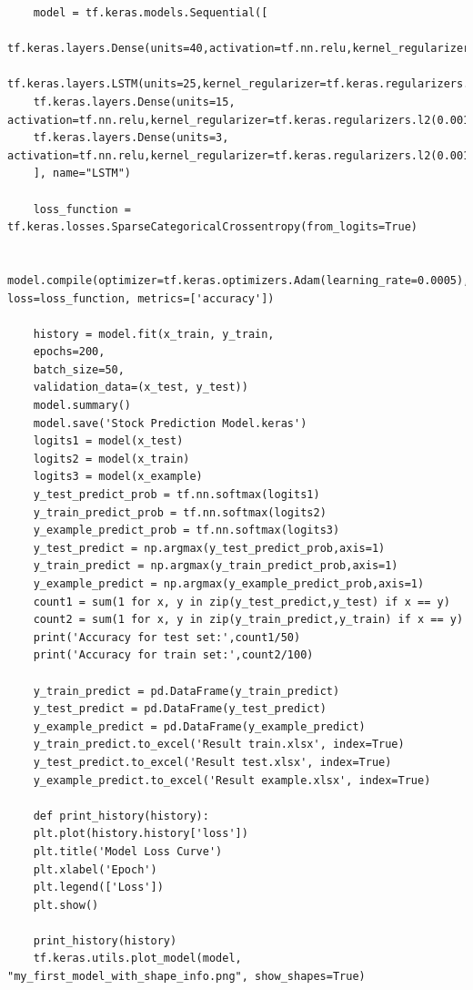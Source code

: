 \documentclass[default,iicol]{sn-jnl}%
\begin{document}
\begin{appendices}
\begin{lstlisting}
	model = tf.keras.models.Sequential([
	tf.keras.layers.Dense(units=40,activation=tf.nn.relu,kernel_regularizer=tf.keras.regularizers.l2(0.001)),
	tf.keras.layers.LSTM(units=25,kernel_regularizer=tf.keras.regularizers.l2(0.001)),
	tf.keras.layers.Dense(units=15, activation=tf.nn.relu,kernel_regularizer=tf.keras.regularizers.l2(0.001)),
	tf.keras.layers.Dense(units=3, activation=tf.nn.relu,kernel_regularizer=tf.keras.regularizers.l2(0.001))
	], name="LSTM")
	
	loss_function = tf.keras.losses.SparseCategoricalCrossentropy(from_logits=True)

	model.compile(optimizer=tf.keras.optimizers.Adam(learning_rate=0.0005), loss=loss_function, metrics=['accuracy'])

	history = model.fit(x_train, y_train,
	epochs=200,
	batch_size=50,
	validation_data=(x_test, y_test))
	model.summary()
	model.save('Stock Prediction Model.keras')
	logits1 = model(x_test)
	logits2 = model(x_train)
	logits3 = model(x_example)
	y_test_predict_prob = tf.nn.softmax(logits1)
	y_train_predict_prob = tf.nn.softmax(logits2)
	y_example_predict_prob = tf.nn.softmax(logits3)
	y_test_predict = np.argmax(y_test_predict_prob,axis=1)
	y_train_predict = np.argmax(y_train_predict_prob,axis=1)
	y_example_predict = np.argmax(y_example_predict_prob,axis=1)
	count1 = sum(1 for x, y in zip(y_test_predict,y_test) if x == y)
	count2 = sum(1 for x, y in zip(y_train_predict,y_train) if x == y)
	print('Accuracy for test set:',count1/50)
	print('Accuracy for train set:',count2/100)
	
	y_train_predict = pd.DataFrame(y_train_predict)
	y_test_predict = pd.DataFrame(y_test_predict)
	y_example_predict = pd.DataFrame(y_example_predict)
	y_train_predict.to_excel('Result train.xlsx', index=True)
	y_test_predict.to_excel('Result test.xlsx', index=True)
	y_example_predict.to_excel('Result example.xlsx', index=True)
	
	def print_history(history):
	plt.plot(history.history['loss'])
	plt.title('Model Loss Curve')
	plt.xlabel('Epoch')
	plt.legend(['Loss'])
	plt.show()
	
	print_history(history)
	tf.keras.utils.plot_model(model, "my_first_model_with_shape_info.png", show_shapes=True)
\end{lstlisting}
\end{appendices}
\clearpage
\twocolumn


\end{document}
